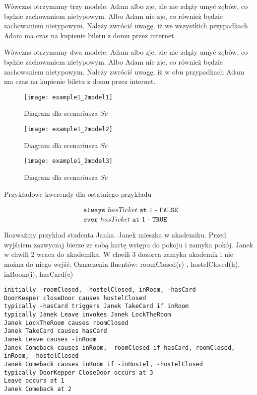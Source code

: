 Wówczas otrzymamy trzy modele. 
Adam albo zje, ale nie zdąży umyć zębów, co będzie zachowaniem nietypowym. 
Albo Adam nie zje, co również będzie zachowaniem nietypowym. 
Należy zwrócić uwagę, iż we wszystkich przypadkach Adam ma czas na kupienie biletu z domu przez internet. 

Wówczas otrzymamy dwa modele. Adam albo zje, ale nie zdąży umyć zębów, co będzie zachowaniem nietypowym.
Albo Adam nie zje, co również będzie zachowaniem nietypowym. Należy zwrócić uwagę, iż w obu przypadkach
Adam ma czas na kupienie biletu z domu przez internet.

\begin{figure}[h!]
	\centering
	\texttt{[image: example1\_2model1]}
	\caption{Diagram dla scenariusza $Sc$}
	\label{PicSC2}
\end{figure}

\begin{figure}[h!]
	\centering
	\texttt{[image: example1\_2model2]}
	\caption{Diagram dla scenariusza $Sc$}
	\label{PicSC3}
\end{figure}

\begin{figure}[h!]
	\centering
	\texttt{[image: example1\_2model3]}
	\caption{Diagram dla scenariusza $Sc$}
	\label{PicSC4}
\end{figure}

Przykładowe kwerendy dla ostatniego przykładu
	
	\begin{align*}
	&\texttt{always } hasTicket \texttt{ at } 1 \texttt{ - FALSE } \\
	&\texttt{ever } hasTicket \texttt{ at } 1 \texttt{ - TRUE }
	\end{align*}
	
Rozważmy przykład studenta Janka. Janek mieszka w akademiku. 
Przed wyjściem zazwyczaj bierze ze sobą kartę wstępu do pokoju i zamyka pokój. 
Janek w chwili 2 wraca do akademika. W chwili 3 dozorca zamyka akademik i nie można do niego wejść. 
Oznaczenia fluentów: roomClosed(r) , hostelClosed(h), inRoom(i), hasCard(c)

	\begin{lstlisting}
initially -roomClosed, -hostelClosed, inRoom, -hasCard
DoorKeeper closeDoor causes hostelClosed
typically -hasCard triggers Janek TakeCard if inRoom
typically Janek Leave invokes Janek LockTheRoom
Janek LockTheRoom causes roomClosed
Janek TakeCard causes hasCard
Janek Leave causes -inRoom
Janek Comeback causes inRoom, -roomClosed if hasCard, roomClosed, -inRoom, -hostelClosed
Janek Comeback causes inRoom if -inHostel, -hostelClosed
typically DoorKepper CloseDoor occurs at 3
Leave occurs at 1
Janek Comeback at 2
	\end{lstlisting}


